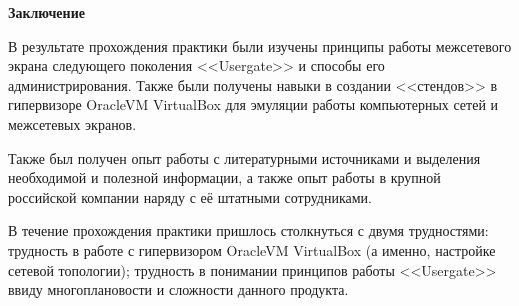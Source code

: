 \newpage

\begin{center}
	\textbf{\Large Заключение}
\end{center}

В результате прохождения практики были изучены принципы работы межсетевого экрана следующего поколения <<Usergate>> и способы его администрирования. Также были получены навыки в создании <<стендов>> в гипервизоре OracleVM VirtualBox для эмуляции работы компьютерных сетей и межсетевых экранов.
		
Также был получен опыт работы с литературными источниками и выделения необходимой и полезной информации, а также опыт работы в крупной российской компании наряду с её штатными сотрудниками.
		
В течение прохождения практики пришлось столкнуться с двумя трудностями: трудность в работе с гипервизором OracleVM VirtualBox (а именно, настройке сетевой топологии); трудность в понимании принципов работы <<Usergate>> ввиду многоплановости и сложности данного продукта.

\printbibliography[heading=bibintoc, title={Список литературы}]
